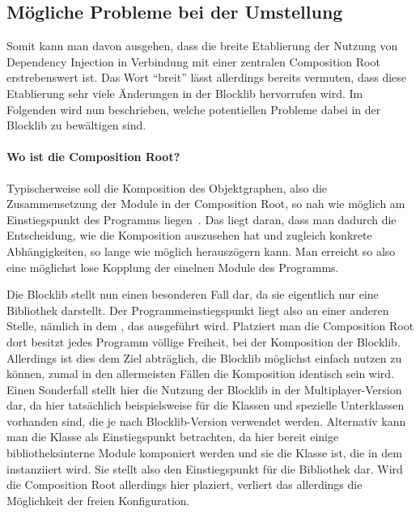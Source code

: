 \subsection{Mögliche Probleme bei der Umstellung}

Somit kann man davon ausgehen, dass die breite Etablierung der Nutzung von Dependency Injection in Verbindung mit einer zentralen Composition Root erstrebenswert ist. Das Wort \enquote{breit} lässt allerdings bereits vermuten, dass diese Etablierung sehr viele Änderungen in der Blocklib hervorrufen wird. Im Folgenden wird nun beschrieben, welche potentiellen Probleme dabei in der Blocklib zu bewältigen sind.

\paragraph{Wo ist die Composition Root?}
Typischerweise soll die Komposition des Objektgraphen, also die Zusammensetzung der Module in der Composition Root, so nah wie möglich am Einstiegspunkt des Programms liegen~\cite[S.~232~ff.]{Martin17}\cite[S.~76~f.]{Seemann2012}. Das liegt daran, dass man dadurch die Entscheidung, wie die Komposition auszusehen hat und zugleich konkrete Abhängigkeiten, so lange wie möglich herauszögern kann. Man erreicht so also eine möglichst lose Kopplung der einelnen Module des Programms.

Die Blocklib stellt nun einen besonderen Fall dar, da sie eigentlich nur eine Bibliothek darstellt. Der Programmeinstiegspunkt liegt also an einer anderen Stelle, nämlich in dem , das ausgeführt wird. Platziert man die Composition Root dort besitzt jedes Programm völlige Freiheit, bei der Komposition der Blocklib. Allerdings ist dies dem Ziel abträglich, die Blocklib möglichst einfach nutzen zu können, zumal in den allermeisten Fällen die Komposition identisch sein wird. Einen Sonderfall stellt hier die Nutzung der Blocklib in der Multiplayer-Version dar, da hier tatsächlich beispielsweise für die Klassen  und  spezielle Unterklassen vorhanden sind, die je nach Blocklib-Version verwendet werden. Alternativ kann man die Klasse  als Einstiegspunkt betrachten, da hier bereit einige bibliotheksinterne Module komponiert werden und sie die Klasse ist, die in dem  instanziiert wird. Sie stellt also den Einstiegspunkt für die Bibliothek dar. Wird die Composition Root allerdings hier plaziert, verliert das  allerdings die Möglichkeit der freien Konfiguration.


